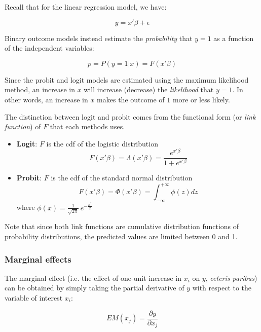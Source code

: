 Recall that for the linear regression model, we have:

\begin{equation}
    y = x'\beta + \epsilon
\end{equation}

Binary outcome models instead estimate the \textit{probability} that $y=1$ as a function of the independent variables:

\begin{equation}
    p = P(y=1 | x) = F(x'\beta)
\end{equation}

Since the probit and logit models are estimated using the maximum likelihood method, an increase in $x$ will increase (decrease) the \textit{likelihood} that $y=1$. In other words, an increase in $x$ makes the outcome of $1$ more or less likely.

The distinction between logit and probit comes from the functional form (or \textit{link function}) of $F$ that each methods uses.

\begin{itemize}
    \item \textbf{Logit}: $F$ is the cdf of the logistic distribution
    $$ F(x'\beta) = \Lambda(x'\beta) = \frac{e^{x'\beta}}{1+e^{x'\beta}} $$

    \item \textbf{Probit}: $F$ is the cdf of the standard normal distribution
    $$ F(x'\beta) = \Phi(x'\beta) = \int_{-\infty}^{+\infty} \phi(z)dz $$
    where $\phi(x) = \frac{1}{\sqrt{2\pi}}\ e^{-\frac{x^2}{2}}$
\end{itemize}

Note that since both link functions are cumulative distribution functions of probability distributions, the predicted values are limited between 0 and 1.


\subsubsection{Marginal effects}
The marginal effect (i.e. the effect of one-unit increase in $x_i$ on $y$, \textit{ceteris paribus}) can be obtained by simply taking the partial derivative of $y$ with respect to the variable of interest $x_i$:

\begin{equation}
    EM(x_j) = \frac{\partial y}{\partial x_j}
\end{equation}

